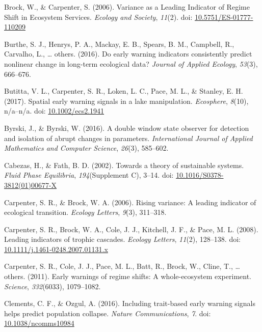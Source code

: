 \documentclass[12pt,twoside,openany]{reedthesis}
\begin{document}
\leavevmode\hypertarget{ref-brock_variance_2006}{}%
Brock, W., \& Carpenter, S. (2006). Variance as a Leading Indicator of Regime Shift in Ecosystem Services. \emph{Ecology and Society}, \emph{11}(2). doi: \href{https://doi.org/10.5751/ES-01777-110209}{10.5751/ES-01777-110209}

\leavevmode\hypertarget{ref-burthe2016early}{}%
Burthe, S. J., Henrys, P. A., Mackay, E. B., Spears, B. M., Campbell, R., Carvalho, L., \ldots{} others. (2016). Do early warning indicators consistently predict nonlinear change in long-term ecological data? \emph{Journal of Applied Ecology}, \emph{53}(3), 666--676.

\leavevmode\hypertarget{ref-butitta_spatial_2017}{}%
Butitta, V. L., Carpenter, S. R., Loken, L. C., Pace, M. L., \& Stanley, E. H. (2017). Spatial early warning signals in a lake manipulation. \emph{Ecosphere}, \emph{8}(10), n/a--n/a. doi: \href{https://doi.org/10.1002/ecs2.1941}{10.1002/ecs2.1941}

\leavevmode\hypertarget{ref-byrski2016double}{}%
Byrski, J., \& Byrski, W. (2016). A double window state observer for detection and isolation of abrupt changes in parameters. \emph{International Journal of Applied Mathematics and Computer Science}, \emph{26}(3), 585--602.

\leavevmode\hypertarget{ref-cabezas_towards_2002}{}%
Cabezas, H., \& Fath, B. D. (2002). Towards a theory of sustainable systems. \emph{Fluid Phase Equilibria}, \emph{194}(Supplement C), 3--14. doi: \href{https://doi.org/10.1016/S0378-3812(01)00677-X}{10.1016/S0378-3812(01)00677-X}

\leavevmode\hypertarget{ref-carpenter2006rising}{}%
Carpenter, S. R., \& Brock, W. A. (2006). Rising variance: A leading indicator of ecological transition. \emph{Ecology Letters}, \emph{9}(3), 311--318.

\leavevmode\hypertarget{ref-carpenter_leading_2008}{}%
Carpenter, S. R., Brock, W. A., Cole, J. J., Kitchell, J. F., \& Pace, M. L. (2008). Leading indicators of trophic cascades. \emph{Ecology Letters}, \emph{11}(2), 128--138. doi: \href{https://doi.org/10.1111/j.1461-0248.2007.01131.x}{10.1111/j.1461-0248.2007.01131.x}

\leavevmode\hypertarget{ref-carpenter2011early}{}%
Carpenter, S. R., Cole, J. J., Pace, M. L., Batt, R., Brock, W., Cline, T., \ldots{} others. (2011). Early warnings of regime shifts: A whole-ecosystem experiment. \emph{Science}, \emph{332}(6033), 1079--1082.

\leavevmode\hypertarget{ref-clements_including_2016}{}%
Clements, C. F., \& Ozgul, A. (2016). Including trait-based early warning signals helps predict population collapse. \emph{Nature Communications}, \emph{7}. doi: \href{https://doi.org/10.1038/ncomms10984}{10.1038/ncomms10984}
\end{document}
